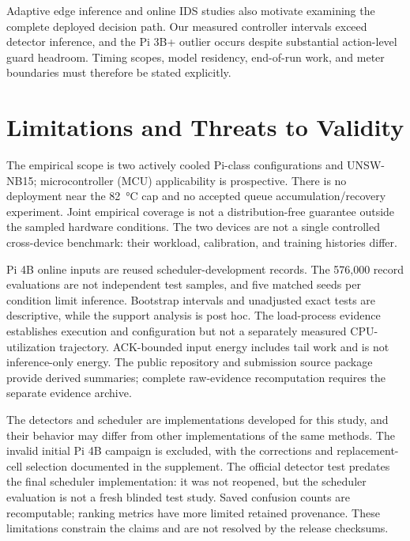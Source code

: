 \documentclass[journal]{IEEEtran}
\begin{document}
Adaptive edge inference and online IDS studies \cite{tan2024workloadadaptive,zhang2024dvfo,nakip2024selfsupervised,yang2025openset} also motivate examining the complete deployed decision path. Our measured controller intervals exceed detector inference, and the Pi 3B+ outlier occurs despite substantial action-level guard headroom. Timing scopes, model residency, end-of-run work, and meter boundaries must therefore be stated explicitly.

\section{Limitations and Threats to Validity}
The empirical scope is two actively cooled Pi-class configurations and UNSW-NB15; microcontroller (MCU) applicability is prospective. There is no deployment near the \SI{82}{\celsius} cap and no accepted queue accumulation/recovery experiment. Joint empirical coverage is not a distribution-free guarantee outside the sampled hardware conditions. The two devices are not a single controlled cross-device benchmark: their workload, calibration, and training histories differ.

Pi 4B online inputs are reused scheduler-development records. The 576,000 record evaluations are not independent test samples, and five matched seeds per condition limit inference. Bootstrap intervals and unadjusted exact tests are descriptive, while the support analysis is post hoc. The load-process evidence establishes execution and configuration but not a separately measured CPU-utilization trajectory. ACK-bounded input energy includes tail work and is not inference-only energy. The public repository and submission source package provide derived summaries; complete raw-evidence recomputation requires the separate evidence archive.

The detectors and scheduler are implementations developed for this study, and their behavior may differ from other implementations of the same methods. The invalid initial Pi 4B campaign is excluded, with the corrections and replacement-cell selection documented in the supplement. The official detector test predates the final scheduler implementation: it was not reopened, but the scheduler evaluation is not a fresh blinded test study. Saved confusion counts are recomputable; ranking metrics have more limited retained provenance. These limitations constrain the claims and are not resolved by the release checksums.
\end{document}
